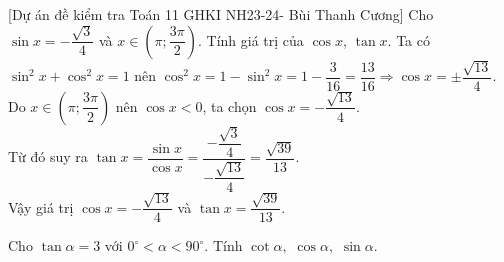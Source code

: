 \begin{bt}%
[Dự án đề kiểm tra Toán 11 GHKI NH23-24- Bùi Thanh Cương]%
	Cho $\sin x=-\dfrac{\sqrt{3}}{4}$ và $x \in\left(\pi ; \dfrac{3 \pi}{2}\right)$. Tính giá trị của $\cos x$, $\tan x$.
	\loigiai
	{Ta có $\sin^2x+\cos^2x=1$ nên $\cos^2x=1-\sin^2x=1-\dfrac{3}{16}=\dfrac{13}{16}\Rightarrow \cos x=\pm\dfrac{\sqrt{13}}{4}$.\\
		Do $x\in\left(\pi; \dfrac{3\pi}{2}\right)$ nên $\cos x<0$, ta chọn $\cos x=-\dfrac{\sqrt{13}}{4}$.\\
		Từ đó suy ra 
		$\tan x =\dfrac{\sin x }{\cos x}=\dfrac{-\dfrac{\sqrt{3}}{4}}{-\dfrac{\sqrt{13}}{4}}=\dfrac{\sqrt{39}}{13}$.\\
		Vậy giá trị  $\cos x= -\dfrac{\sqrt{13}}{4}$ và $\tan x=\dfrac{\sqrt{39}}{13}$.
	}
\end{bt}

\begin{bt}%
	Cho $\tan \alpha=3$ với $0^{\circ}<\alpha<90^{\circ}$. Tính $\cot \alpha,$ $\cos \alpha,$ $\sin \alpha$.
\end{bt}

